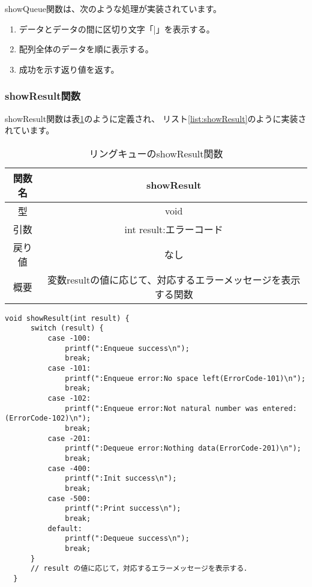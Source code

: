 \documentclass[a4j]{jarticle}
\begin{document}
showQueue関数は、次のような処理が実装されています。
\begin{enumerate}
  \item データとデータの間に区切り文字「|」を表示する。
  \item 配列全体のデータを順に表示する。
  \item 成功を示す返り値を返す。
\end{enumerate}

\subsubsection{showResult関数}
showResult関数は表\ref{table:showResult}のように定義され、
リスト\ref{list:showResult}のように実装されています。

\begin{table}[htbp]
  \centering
  \caption{リングキューのshowResult関数}
  \label{table:showResult}
  \begin{tabular}{|c|c|}
    \hline
    関数名 & showResult                         \\
    \hline
    型   & void                               \\
    \hline
    引数  & int result:エラーコード                  \\
    \hline
    戻り値 & なし                                 \\
    \hline
    概要  & 変数resultの値に応じて、対応するエラーメッセージを表示する関数 \\
    \hline
  \end{tabular}
\end{table}

\begin{lstlisting}[caption=リングキューのshowResult関数の実装,label=list:showResult]
  void showResult(int result) {
      switch (result) {
          case -100:
              printf(":Enqueue success\n");
              break;
          case -101:
              printf(":Enqueue error:No space left(ErrorCode-101)\n");
              break;
          case -102:
              printf(":Enqueue error:Not natural number was entered:(ErrorCode-102)\n");
              break;
          case -201:
              printf(":Dequeue error:Nothing data(ErrorCode-201)\n");
              break;
          case -400:
              printf(":Init success\n");
              break;
          case -500:
              printf(":Print success\n");
              break;
          default:
              printf(":Dequeue success\n");
              break;
      }
      // result の値に応じて，対応するエラーメッセージを表示する．
  }
\end{lstlisting}
\end{document}
